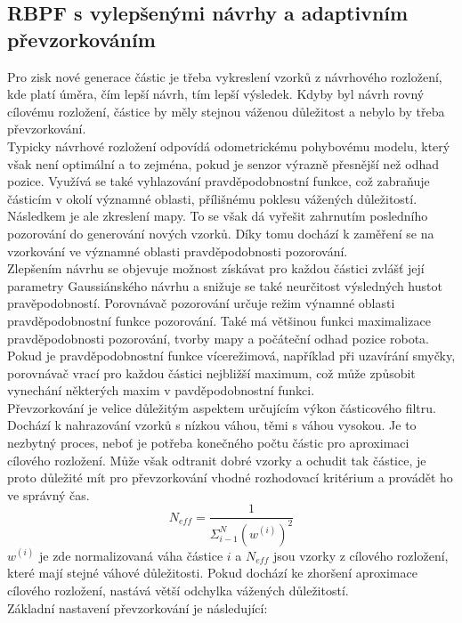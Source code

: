 \documentclass[12pt]{article}
\begin{document}
\subsection{RBPF s vylepšenými návrhy a adaptivním převzorkováním}
Pro zisk nové generace částic je třeba vykreslení vzorků z návrhového rozložení, kde platí úměra, čím lepší návrh, tím lepší výsledek. Kdyby byl návrh rovný cílovému rozložení, částice by měly stejnou váženou důležitost a nebylo by třeba převzorkování. \\
\indent Typicky návrhové rozložení odpovídá odometrickému pohybovému modelu, který však není optimální a to zejména, pokud je senzor výrazně přesnější než odhad pozice. Využívá se také vyhlazování pravděpodobnostní funkce, což zabraňuje částicím v okolí významné oblasti, přílišnému poklesu vážených důležitostí. Následkem je ale zkreslení mapy. To se však dá vyřešit zahrnutím posledního pozorování do generování nových vzorků. Díky tomu dochází k zaměření se na vzorkování ve významné oblasti pravděpodobnosti pozorování.\\
\indent Zlepšením návrhu se objevuje možnost získávat pro každou částici zvlášť její parametry Gaussiánského návrhu a snižuje se také neurčitost výsledných hustot pravěpodobností. Porovnávač pozorování určuje režim výnamné oblasti pravděpodobnostní funkce pozorování. Také má většinou funkci maximalizace pravděpodobnosti pozorování, tvorby mapy a počáteční odhad pozice robota. Pokud je pravděpodobnostní funkce vícerežimová, například při uzavírání smyčky, porovnávač vrací pro každou částici nejbližší maximum, což může způsobit vynechání některých maxim v pavděpodobnostní funkci.\\
\indent Převzorkování je velice důležitým aspektem určujícím výkon částicového filtru. Dochází k nahrazování vzorků s nízkou váhou, těmi s váhou vysokou. Je to nezbytný proces, neboť je potřeba konečného počtu částic pro aproximaci cílového rozložení. Může však odtranit dobré vzorky a ochudit tak částice, je proto důležité mít pro převzorkování vhodné rozhodovací kritérium a provádět ho ve správný čas. 
\begin{equation}
	N_{eff}=\frac{1}{\varSigma_{i-1}^N(w^{(i)})^2}
\end{equation} 
$w^{(i)}$ je zde normalizovaná váha částice $i$ a $N_{eff}$ jsou vzorky z cílového rozložení, které mají stejné váhové důležitosti. Pokud dochází ke zhoršení aproximace cílového rozložení, nastává větší odchylka vážených důležitostí.\\
Základní nastavení převzorkování je následující:
\end{document}
